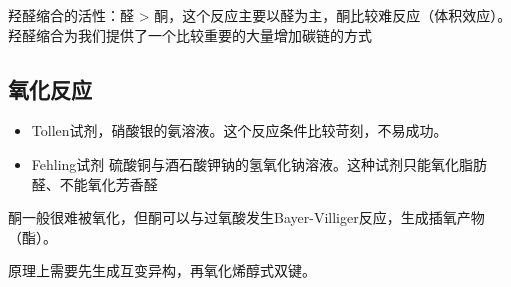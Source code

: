     羟醛缩合的活性：醛 > 酮，这个反应主要以醛为主，酮比较难反应（体积效应）。羟醛缩合为我们提供了一个比较重要的大量增加碳链的方式

    \subsection{氧化反应}

    \begin{itemize}
        \item  Tollen试剂，硝酸银的氨溶液。这个反应条件比较苛刻，不易成功。
        \item  Fehling试剂 硫酸铜与酒石酸钾钠的氢氧化钠溶液。这种试剂只能氧化脂肪醛、不能氧化芳香醛
    \end{itemize}

    酮一般很难被氧化，但酮可以与过氧酸发生Bayer-Villiger反应，生成插氧产物（酯）。

    原理上需要先生成互变异构，再氧化烯醇式双键。
